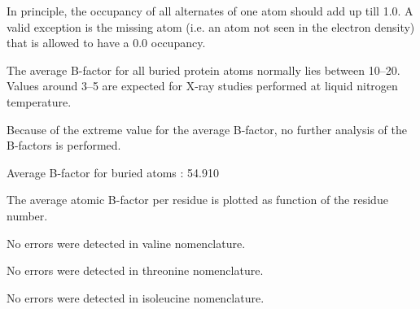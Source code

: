 \begin{note}
In principle, the occupancy of all alternates of one atom should add up till
1.0. A valid exception is the missing atom (i.e. an atom not seen in the
electron density) that is allowed to have a 0.0 occupancy.
\end{note}

\begin{warning}
The average B-factor for all buried protein atoms normally lies between
10--20. Values around 3--5 are expected for X-ray studies performed
at liquid nitrogen temperature.

Because of the extreme value for the average B-factor, no further analysis
of the B-factors is performed.

\parbox{1\textwidth}{
Average B-factor for buried atoms : 54.910
}%

\end{warning}

\begin{note}
The average atomic B-factor per residue is plotted as function of
the residue number.

\parbox{1\textwidth}{
}%


\parbox{1\textwidth}{
}%

\end{note}

\begin{note}


\parbox{1\textwidth}{
}%


\parbox{1\textwidth}{
}%

\end{note}

\begin{note}
No errors were detected in valine nomenclature.
\end{note}

\begin{note}
No errors were detected in threonine nomenclature.
\end{note}

\begin{note}
No errors were detected in isoleucine nomenclature.
\end{note}

